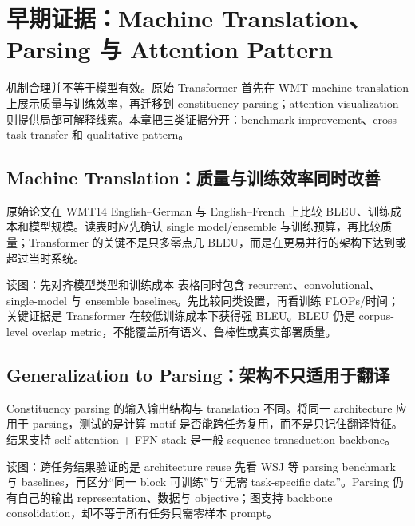 \section{早期证据：Machine Translation、Parsing 与 Attention Pattern}

机制合理并不等于模型有效。原始 Transformer 首先在 WMT machine translation 上展示质量与训练效率，再迁移到 constituency parsing；attention visualization 则提供局部可解释线索。本章把三类证据分开：benchmark improvement、cross-task transfer 和 qualitative pattern。

\subsection{Machine Translation：质量与训练效率同时改善}

原始论文在 WMT14 English--German 与 English--French 上比较 BLEU、训练成本和模型规模。读表时应先确认 single model/ensemble 与训练预算，再比较质量；Transformer 的关键不是只多零点几 BLEU，而是在更易并行的架构下达到或超过当时系统。


\begin{knowledgebox}{读图：先对齐模型类型和训练成本}
表格同时包含 recurrent、convolutional、single-model 与 ensemble baselines。先比较同类设置，再看训练 FLOPs/时间；关键证据是 Transformer 在较低训练成本下获得强 BLEU。BLEU 仍是 corpus-level overlap metric，不能覆盖所有语义、鲁棒性或真实部署质量。
\end{knowledgebox}

\subsection{Generalization to Parsing：架构不只适用于翻译}

Constituency parsing 的输入输出结构与 translation 不同。将同一 architecture 应用于 parsing，测试的是计算 motif 是否能跨任务复用，而不是只记住翻译特征。结果支持 self-attention + FFN stack 是一般 sequence transduction backbone。


\begin{knowledgebox}{读图：跨任务结果验证的是 architecture reuse}
先看 WSJ 等 parsing benchmark 与 baselines，再区分“同一 block 可训练”与“无需 task-specific data”。Parsing 仍有自己的输出 representation、数据与 objective；图支持 backbone consolidation，却不等于所有任务只需零样本 prompt。
\end{knowledgebox}

